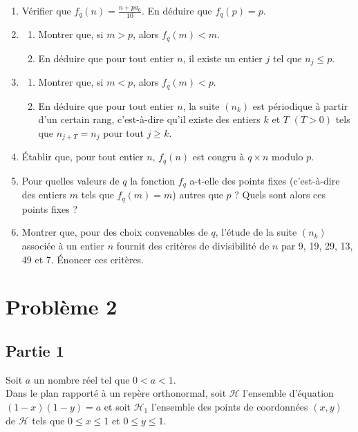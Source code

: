 \documentclass[landscape,twocolumn,leqno,a4paper,10pt]{report} %
\newcommand\n{\noindent}
\renewcommand{\geq}{\geqslant}
\renewcommand{\leq}{\leqslant}
\begin{document}
\begin{enumerate}
	\item Vérifier que $f_{q}(n)=\frac{n+p a_{0}}{10}$. En déduire que $f_{q}(p)=p$.
	\item \begin{enumerate}
		\item Montrer que, si $m>p$, alors $f_{q}(m)<m$.
		\item En déduire que pour tout entier $n$, il existe un entier $j$ tel que $n_{j} \leq p$.
	\end{enumerate}
	\item \begin{enumerate}
		\item Montrer que, si $m<p$, alors $f_{q}(m)<p$.
		\item En déduire que pour tout entier $n$, la suite $\left(n_{k}\right)$ est périodique à partir d'un certain rang, c'est-à-dire qu'il existe des entiers $k$ et $T$ $(T>0)$ tels que $n_{j+T}=n_{j}$ pour tout $j \geq k$.
	\end{enumerate}
	\item Établir que, pour tout entier $n$, $f_{q}(n)$ est congru à $q \times n$ modulo $p$.
	\item Pour quelles valeurs de $q$ la fonction $f_{q}$ a-t-elle des points fixes (c'est-à-dire des entiers $m$ tels que $f_{q}(m)=m$) autres que $p$ ? Quels sont alors ces points fixes ?
	\item Montrer que, pour des choix convenables de $q$, l'étude de la suite $\left(n_{k}\right)$ associée à un entier $n$ fournit des critères de divisibilité de $n$ par 9, 19, 29, 13, 49 et 7. Énoncer ces critères.
\end{enumerate}


\section{Problème 2}

\subsection{Partie 1}

\n Soit $a$ un nombre réel tel que $0<a<1$.\\
Dans le plan rapporté à un repère orthonormal, soit $\mathscr{H}$ l'ensemble d'équation $(1-x)(1-y)=a$ et soit $\mathscr{H}_{1}$ l'ensemble des points de coordonnées $(x, y)$ de $\mathscr{H}$ tels que $0 \leq x \leq 1$ et $0 \leq y \leq 1$.
\end{document}
